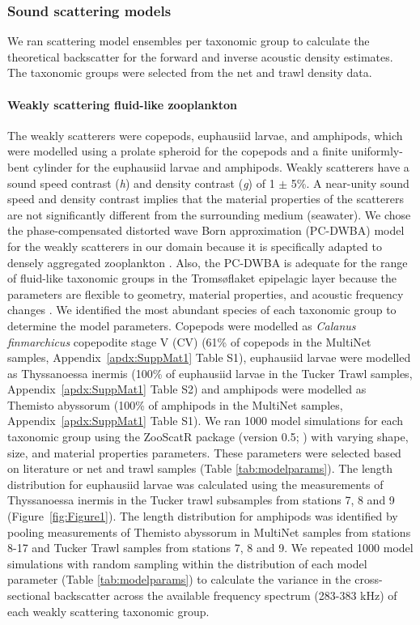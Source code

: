 \subsubsection{Sound scattering models}
We ran scattering model ensembles per taxonomic group to calculate the theoretical backscatter for the forward and inverse acoustic density estimates. The taxonomic groups were selected from the net and trawl density data.
\paragraph{Weakly scattering fluid-like zooplankton}
The weakly scatterers were copepods, euphausiid larvae, and amphipods, which were modelled using a prolate spheroid for the copepods and a finite uniformly-bent cylinder for the euphausiid larvae and amphipods. Weakly scatterers have a sound speed contrast (\textit{h}) and density contrast (\textit{g}) of 1 $\pm$ 5\%. A near-unity sound speed and density contrast implies that the material properties of the scatterers are not significantly different from the surrounding medium (seawater). We chose the phase-compensated distorted wave Born approximation (PC-DWBA) model for the weakly scatterers in our domain because it is specifically adapted to densely aggregated zooplankton \citep{Chu1999}. Also, the PC-DWBA is adequate for the range of fluid-like taxonomic groups in the Tromsøflaket epipelagic layer because the parameters are flexible to geometry, material properties, and acoustic frequency changes \citep{Chu1999, Gastauer2019}. We identified the most abundant species of each taxonomic group to determine the model parameters. Copepods were modelled as \textit{Calanus finmarchicus} copepodite stage V (CV) (61\% of copepods in the MultiNet samples, Appendix~\ref{apdx:SuppMat1} Table S1), euphausiid larvae were modelled as Thyssanoessa inermis (100\% of euphausiid larvae in the Tucker Trawl samples, Appendix~\ref{apdx:SuppMat1} Table S2) and amphipods were modelled as Themisto abyssorum (100\% of amphipods in the MultiNet samples, Appendix~\ref{apdx:SuppMat1} Table S1). We ran 1000 model simulations for each taxonomic group using the ZooScatR package (version 0.5; \citep{Gastauer2019}) with varying shape, size, and material properties parameters. These parameters were selected based on literature or net and trawl samples (Table \ref{tab:modelparams}). The length distribution for euphausiid larvae was calculated using the measurements of Thyssanoessa inermis in the Tucker trawl subsamples from stations 7, 8 and 9 (Figure~\ref{fig:Figure1}). The length distribution for amphipods was identified by pooling measurements of Themisto abyssorum in MultiNet samples from stations 8-17 and Tucker Trawl samples from stations 7, 8 and 9. We repeated 1000 model simulations with random sampling within the distribution of each model parameter (Table \ref{tab:modelparams}) to calculate the variance in the cross-sectional backscatter across the available frequency spectrum (283-383 kHz) of each weakly scattering taxonomic group. 

